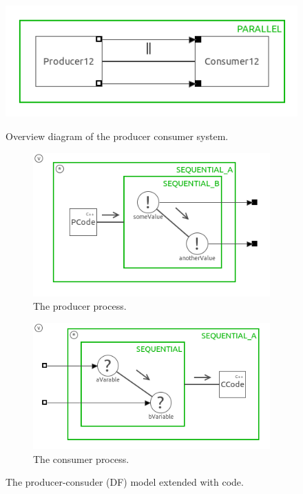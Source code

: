 \documentclass[a4paper,twoside,11pt]{article}
\begin{document}
\begin{figure}
 \centering
  \includegraphics[scale=0.8]{./images/1_2-SystemDF+_main.png}
  \caption{Overview diagram of the producer consumer system.}
 \begin{subfigure}{0.5\textwidth}
  \centering
	\includegraphics[width=\textwidth]{./images/1_2-SystemDF+_prod.png}
	\caption{The producer process.}
 \end{subfigure}%
 \begin{subfigure}{0.5\textwidth}
  \centering
	\includegraphics[width=\textwidth]{./images/1_2-SystemDF+_cons.png}
	\caption{The consumer process.}
 \end{subfigure}
 \caption{The producer-consuder (DF) model extended with code.}
 \label{fig:SystemDF+}
\end{figure}
\end{document}
